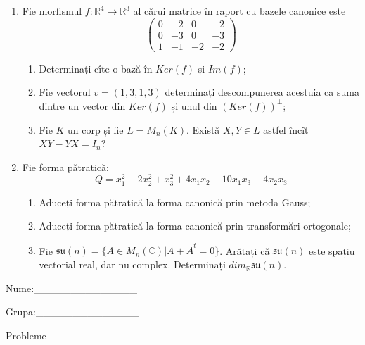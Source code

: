 \documentclass{article}
\begin{document}
\begin{enumerate}
 \item Fie morfismul $f:\mathbb{R}^4 \to \mathbb{R}^3$ al cărui matrice în raport cu bazele canonice este
$$\begin{pmatrix}
0&-2&0&-2\\
0&-3&0&-3\\
1&-1&-2&-2
\end{pmatrix}$$

\begin{enumerate}
\item Determinați cîte o bază în $Ker(f)$ și $Im(f)$;
\item Fie vectorul $v=(1,3,1,3)$ determinați descompunerea acestuia ca suma dintre un vector din $Ker(f)$ și unul din $(Ker(f))^\perp$;
\item Fie $K$ un corp și fie $L=M_n(K)$. Există $X,Y \in L$ astfel încît $XY-YX=I_n$?  
\end{enumerate}
\item Fie forma pătratică:
$$Q= x_1^2-2x_2^2+x_3^2+4x_1x_2-10x_1x_3+4x_2x_3$$

\begin{enumerate}
\item Aduceți forma pătratică la forma canonică prin metoda Gauss;
\item Aduceți forma pătratică la forma canonică prin transformări ortogonale;
\item Fie $\mathfrak{su}(n)=\{ A \in M_n(\mathbb{C}) | A+\bar{A}^t=0\}$. Arătați că $\mathfrak{su}(n)$ este spațiu vectorial real, dar nu complex.
Determinați $dim_{\mathbb{R}}\mathfrak{su}(n)$.
\end{enumerate}
\end{enumerate}
\newpage
\begin{flushright}
Nume:\_\_\_\_\_\_\_\_\_\_\_\_\_\_
 
 
Grupa:\_\_\_\_\_\_\_\_\_\_\_\_\_\_
\end{flushright}
\begin{center}
\vspace{2cm}
{\Large Probleme}
\vspace{2cm}
\end{center}
\end{document}
